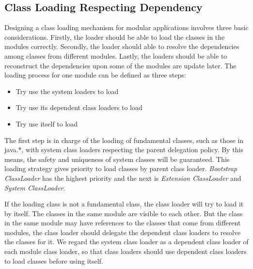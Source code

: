 \documentclass[conference]{IEEEtran}
\begin{document}
\subsection{Class Loading Respecting Dependency}

Designing a class loading mechanism for modular applications involves three basic considerations. Firstly, the loader should be able to load the classes in the modules correctly. Secondly, the loader should able to resolve the dependencies among classes from different modules. Lastly, the loaders should be able to reconstruct the dependencies upon some of the modules are update later. 
The loading process for one module can be defined as three steps:
\begin{itemize}
\item Try use the system loaders to load
\item Try use its dependent class loaders to load
\item Try use itself to load
\end{itemize}

The first step is in charge of the loading of fundamental classes, such as those in java.*, with system class loaders respecting the parent delegation policy\cite{parent_delegation}. By this means, the safety and uniqueness of system classes will be guaranteed. This loading strategy gives priority to load classes by parent class loader. \emph{Bootstrap ClassLoader} has the highest priority and the next is \emph{Extension ClassLoader} and \emph{System ClassLoader}. 

If the loading class is not a fundamental class, the class loader will try to load it by itself. The classes in the same module are visible to each other. But the class in the same module may have references to the classes that come from different modules, the class loader should delegate the dependent class loaders to resolve the classes for it. We regard the system class loader as a dependent class loader of each module class loader, so that class loaders should use dependent class loaders to load classes before using itself.
\end{document}
